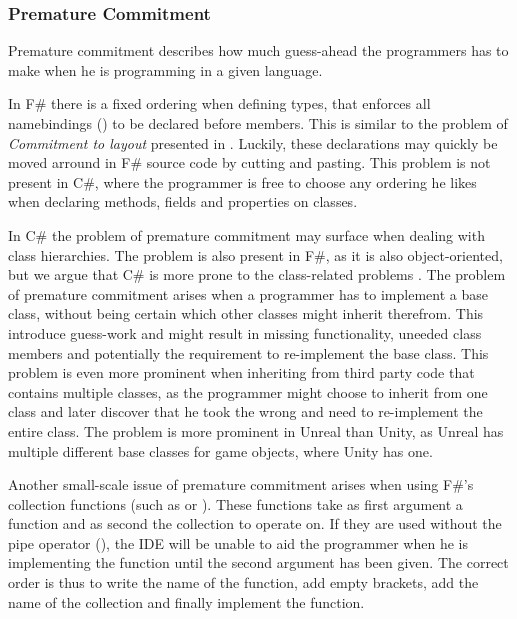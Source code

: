 \subsubsection{Premature Commitment}
Premature commitment describes how much guess-ahead the programmers has to make when he is programming in a given language. 

In F\# there is a fixed ordering when defining types, that enforces all namebindings () to be declared before members. This is similar to the problem of \textit{Commitment to layout} presented in \cite{green1996usability}. Luckily, these declarations may quickly be moved arround in F\# source code by cutting and pasting. This problem is not present in C\#, where the programmer is free to choose any ordering he likes when declaring methods, fields and properties on classes.

In C\# the problem of premature commitment may surface when dealing with class hierarchies. The problem is also present in F\#, as it is also object-oriented, but we argue that C\# is more prone to the class-related problems . The problem of premature commitment arises when a programmer has to implement a base class, without being certain which other classes might inherit therefrom. This introduce guess-work and might result in missing functionality, uneeded class members and potentially the requirement to re-implement the base class. This problem is even more prominent when inheriting from third party code that contains multiple classes, as the programmer might choose to inherit from one class and later discover that he took the wrong and need to re-implement the entire class. The problem is more prominent in Unreal than Unity, as Unreal has multiple different base classes for game objects\needcite, where Unity has one.

Another small-scale issue of premature commitment arises when using F\#'s collection functions (such as  or ). These functions take as first argument a function and as second the collection to operate on. If they are used without the pipe operator (\ttt{|\textgreater}), the \gls{IDE} will be unable to aid the programmer when he is implementing the function until the second argument has been given. The correct order is thus to write the name of the function, add empty brackets, add the name of the collection and finally implement the function.